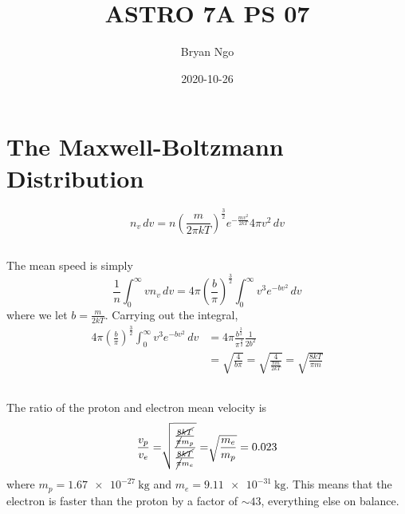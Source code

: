 \documentclass{article}
\title{ASTRO 7A PS 07}
\author{Bryan Ngo}
\date{2020-10-26}
\begin{document}
\maketitle

\section{The Maxwell-Boltzmann Distribution}

\begin{equation}
    n_v \, dv = n \left(\frac{m}{2 \pi kT}\right)^{\frac{3}{2}} e^{-\frac{m v^2}{2 kT}} 4 \pi v^2 \, dv
\end{equation}

\subsection{}

The mean speed is simply
\begin{equation}
    \frac{1}{n} \int_0^\infty v n_v \, dv = 4 \pi \left(\frac{b}{\pi}\right)^{\frac{3}{2}} \int_0^\infty v^3 e^{-b v^2} \, dv
\end{equation}
where we let \(b = \frac{m}{2 kT}\).
Carrying out the integral,
\begin{align}
    4 \pi \left(\frac{b}{\pi}\right)^{\frac{3}{2}} \int_0^\infty v^3 e^{-b v^2} \, dv &= 4 \pi \frac{b^{\frac{3}{2}}}{\pi^{\frac{3}{2}}} \frac{1}{2 b^2} \\
    &= \sqrt{\frac{4}{b \pi}} = \sqrt{\frac{4}{\frac{\pi m}{2 kT}}} = \sqrt{\frac{8 k T}{\pi m}}
\end{align}

\subsection{}

The ratio of the proton and electron mean velocity is
\begin{equation}
    \frac{v_p}{v_e} = \sqrt[]{\frac{\frac{\cancel{8 k T}}{\cancel{\pi} m_p}}{\frac{\cancel{8 k T}}{\cancel{\pi} m_e}}} = \sqrt[]{\frac{m_e}{m_p}} = \num{0.023}
\end{equation}
where \(m_p = \SI{1.67e-27}{\kilogram}\) and \(m_e = \SI{9.11e-31}{\kilogram}\).
This means that the electron is faster than the proton by a factor of \(\sim 43\), everything else on balance.

\subsection{}
\end{document}
